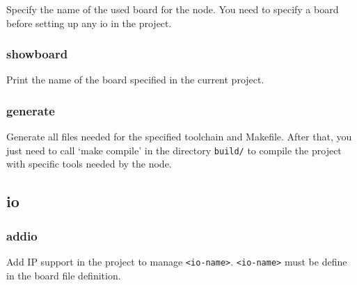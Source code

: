 \documentclass[10pt,a4paper]{article}
\begin{document}
Specify the name of the used board for the node. You need to specify a board before setting up any io in the project.



\subsubsection{showboard}

Print the name of the board specified in the current project.



\subsubsection{generate}

Generate all files needed for the specified toolchain and Makefile. After that, you just need to call `make compile' in the directory \texttt{build/} to compile the project with specific tools needed by the node.


\subsection{io}
\subsubsection{addio}

Add IP support in the project to manage \texttt{<io-name>}. \texttt{<io-name>} must be define in the board file definition.
\end{document}
